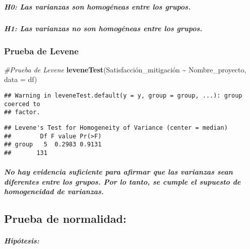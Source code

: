 \documentclass[
]{article}
\newenvironment{Shaded}{\begin{snugshade}}{\end{snugshade}}
\newcommand{\AttributeTok}[1]{\textcolor[rgb]{0.13,0.29,0.53}{#1}}
\newcommand{\CommentTok}[1]{\textcolor[rgb]{0.56,0.35,0.01}{\textit{#1}}}
\newcommand{\FunctionTok}[1]{\textcolor[rgb]{0.13,0.29,0.53}{\textbf{#1}}}
\newcommand{\NormalTok}[1]{#1}
\newcommand{\SpecialCharTok}[1]{\textcolor[rgb]{0.81,0.36,0.00}{\textbf{#1}}}
\begin{document}
\subparagraph{H0: Las varianzas son homogéneas entre los
grupos.}\label{h0-las-varianzas-son-homoguxe9neas-entre-los-grupos.}

\subparagraph{H1: Las varianzas no son homogéneas entre los
grupos.}\label{h1-las-varianzas-no-son-homoguxe9neas-entre-los-grupos.}

\subsubsection{\texorpdfstring{\textbf{Prueba de
Levene}}{Prueba de Levene}}\label{prueba-de-levene}

\begin{Shaded}
\begin{Highlighting}[]
\CommentTok{\#Prueba de Levene}
\FunctionTok{leveneTest}\NormalTok{(Satisfacción\_mitigación }\SpecialCharTok{\textasciitilde{}}\NormalTok{ Nombre\_proyecto, }\AttributeTok{data =}\NormalTok{ df)}
\end{Highlighting}
\end{Shaded}

\begin{verbatim}
## Warning in leveneTest.default(y = y, group = group, ...): group coerced to
## factor.
\end{verbatim}

\begin{verbatim}
## Levene's Test for Homogeneity of Variance (center = median)
##        Df F value Pr(>F)
## group   5  0.2983 0.9131
##       131
\end{verbatim}

\subparagraph{\texorpdfstring{\emph{No hay evidencia suficiente para
afirmar que las varianzas sean diferentes entre los grupos. Por lo
tanto, se cumple el supuesto de homogeneidad de
varianzas.}}{No hay evidencia suficiente para afirmar que las varianzas sean diferentes entre los grupos. Por lo tanto, se cumple el supuesto de homogeneidad de varianzas.}}\label{no-hay-evidencia-suficiente-para-afirmar-que-las-varianzas-sean-diferentes-entre-los-grupos.-por-lo-tanto-se-cumple-el-supuesto-de-homogeneidad-de-varianzas.}

\subsection{\texorpdfstring{\textbf{Prueba de
normalidad:}}{Prueba de normalidad:}}\label{prueba-de-normalidad}

\subparagraph{Hipótesis:}\label{hipuxf3tesis-6}
\end{document}
